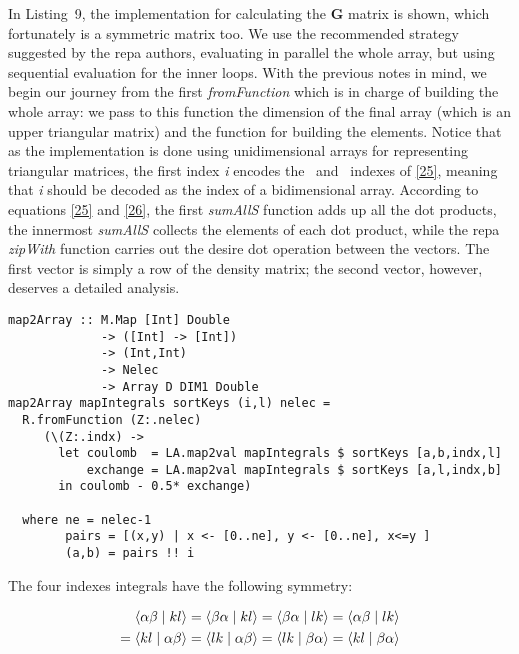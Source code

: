 \documentclass{tmr}
\begin{document}
In Listing~9, the implementation for calculating the \textbf{G} matrix is shown, which
fortunately is a symmetric matrix too.  We use the recommended strategy suggested 
by the repa authors, evaluating in parallel the whole array, but using sequential
evaluation for the inner loops. With the previous notes in mind, we begin our journey from
the first \textit{fromFunction} which is in charge of building the whole array: we pass to
this function the dimension of the final array (which is an upper triangular matrix) and 
the function for building the elements. Notice that 
as the implementation is done using unidimensional arrays for representing triangular
matrices, the first index \textit{i} encodes the \textalpha\ and \textbeta\ indexes of
\eqref{25}, meaning that \textit{i} should be decoded as the index of a bidimensional 
array. According to equations \eqref{25} and \eqref{26}, the first
\textit{sumAllS} function adds up all the dot products, the innermost \textit{sumAllS}
collects the elements of each dot product, while the repa \textit{zipWith} function carries out
the desire dot operation between the vectors. The first vector is simply a row of the
density matrix; the second vector, however, deserves a detailed analysis. 

\begin{lstlisting}[float,captionpos=b,belowcaptionskip=4pt, caption= The Map to Array Function]
map2Array :: M.Map [Int] Double 
             -> ([Int] -> [Int])
             -> (Int,Int) 
             -> Nelec 
             -> Array D DIM1 Double
map2Array mapIntegrals sortKeys (i,l) nelec = 
  R.fromFunction (Z:.nelec)
     (\(Z:.indx) ->
       let coulomb  = LA.map2val mapIntegrals $ sortKeys [a,b,indx,l]
           exchange = LA.map2val mapIntegrals $ sortKeys [a,l,indx,b]
       in coulomb - 0.5* exchange)
                                                            
  where ne = nelec-1
        pairs = [(x,y) | x <- [0..ne], y <- [0..ne], x<=y ]
        (a,b) = pairs !! i
\end{lstlisting}
 
The four indexes integrals have the following symmetry:

\begin{equation} \label{27}
\begin{split}
\braket{\alpha \beta \mid kl} = \braket{ \beta \alpha \mid kl} 
= \braket{\beta \alpha \mid lk} = \braket{\alpha \beta \mid lk} \\
= \braket{kl\mid \alpha \beta} = \braket{lk \mid \alpha \beta} 
=\braket{lk \mid \beta \alpha} = \braket{kl\mid \beta \alpha}
\end{split}
\end{equation}
\end{document}
